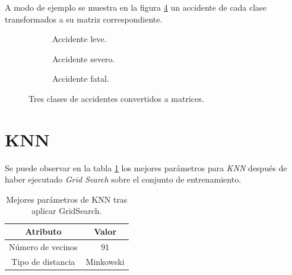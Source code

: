   A modo de ejemplo se muestra en la figura \ref{TresClasesAccidentesMatrices} un accidente de cada clase transformados a su matriz correspondiente.

  \begin{figure}[H]
      \centering
      \begin{subfigure}[b]{0.3\textwidth}
        \centering
        
        \caption{Accidente leve.}
        \label{TresClasesAccidentesMatrices:AccidenteLeveImage}
      \end{subfigure}
      \hspace{1em}
      \begin{subfigure}[b]{0.3\textwidth}
        \centering
        
        \caption{Accidente severo.}
        \label{TresClasesAccidentesMatrices:AccidenteSeveroImage}
      \end{subfigure}
      \hspace{1em}
      \begin{subfigure}[b]{0.3\textwidth}
        \centering
        
        \caption{Accidente fatal.}
        \label{TresClasesAccidentesMatrices:AccidenteFatalImage}
      \end{subfigure}

    \caption{Tres clases de accidentes convertidos a matrices.}
    \label{TresClasesAccidentesMatrices}
  \end{figure}

\section{KNN}

  Se puede observar en la tabla \ref{BestParamsKNNGridSearchTable} los mejores parámetros para \textit{KNN} después de haber ejecutado \textit{Grid Search} sobre el conjunto de entrenamiento.\\

  \begin{table}[H]
      \centering
      \begin{tabular}{ |c|c| }
          \hline
          Atributo & Valor\\
          \hline
              Número de vecinos & 91 \\ 
              Tipo de distancia & Minkowski \\ 
          \hline
      \end{tabular}
      \caption{Mejores parámetros de KNN tras aplicar GridSearch.}
      \label{BestParamsKNNGridSearchTable}
  \end{table}





